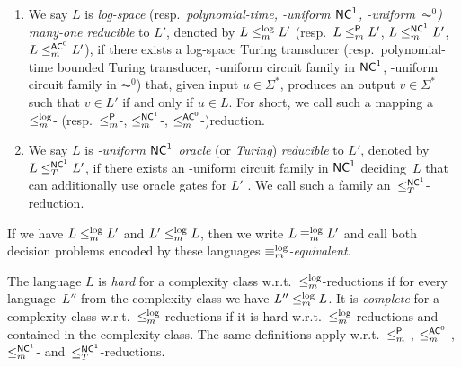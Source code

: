\begin{enumerate} 
\item
We say $L$ is \emph{log-space} (resp.~\emph{polynomial-time, \LOGSPACE-uniform $\textup{\textsf{NC}}^1$, \LOGSPACE-uniform~$\AC^0$) many-one reducible} to $L'$, denoted by $L \le_m^{\log} L'$ (resp.~$L \le_m^{\textup{\textsf{P}}} L'$, 
$L \le_m^{\textup{\textsf{NC}}^{1}} L'$, $L \le_m^{\textup{\textsf{AC}}^{0}} L'$),
if there exists a log-space Turing transducer (resp.~polynomial-time bounded Turing transducer, \LOGSPACE-uniform circuit family in $\textup{\textsf{NC}}^1$, \LOGSPACE-uniform circuit family in $\AC^0$) 
that, given input $u \in \Sigma^*$,
produces an output $v \in \Sigma^*$ such that $v \in L'$ if and only if $u \in L$.
For short, we call such a mapping
a $\le_m^{\log}$- (resp.~$\le_m^{\textup{\textsf{P}}}$-, $\le_m^{\textup{\textsf{NC}}^{1}}$-, $\le_m^{\textup{\textsf{AC}}^0}$-)reduction.

\item 
We say  $L$ is \emph{\LOGSPACE-uniform $\textup{\textsf{NC}}^1$ oracle} (or \emph{Turing}) \emph{reducible}
to $L'$, denoted by $L \le_T^{\textup{\textsf{NC}}^{1}} L'$, if
there exists an \LOGSPACE-uniform  circuit family in $\textup{\textsf{NC}}^1$ deciding~$L$ that can
additionally use oracle gates for $L'$ . We call such a family an~$\le_T^{\textup{\textsf{NC}}^{1}}$-reduction.

\end{enumerate} 


If we have $L \le_m^{\log} L'$ and $L' \le_m^{\log} L$, then we write $L \equiv_m^{\log} L'$ and call both decision problems encoded by these languages
\emph{$\equiv_m^{\log}$-equivalent}. 

The language $L$ is \emph{hard} for a complexity class w.r.t.~$\le_m^{\log}$-reductions 
if for every language~$L''$ from the complexity class we have $L'' \le_m^{\log} L$. 
It is \emph{complete} for a complexity class w.r.t.~$\le_m^{\log}$-reductions if it is hard w.r.t.~$\le_m^{\log}$-reductions
and contained in the complexity class.
The same definitions apply w.r.t.~$\le_m^{\textup{\textsf{P}}}$-, $\le_m^{\textup{\textsf{AC}}^{0}}$-, $\le_m^{\textup{\textsf{NC}}^{1}}$- and~$\le_T^{\textup{\textsf{NC}}^{1}}$-reductions.

